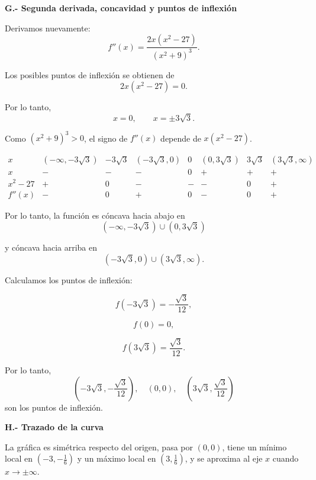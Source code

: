 \documentclass[12pt]{article}
\begin{document}
\begin{enumerate}[label=\alph*.-]
    \textbf{G.- Segunda derivada, concavidad y puntos de inflexión}

    Derivamos nuevamente:
    \[
    f''(x)
    =
    \frac{2x(x^2-27)}{(x^2+9)^3}.
    \]

    Los posibles puntos de inflexión se obtienen de
    \[
    2x(x^2-27)=0.
    \]

    Por lo tanto,
    \[
    x=0,\qquad x=\pm3\sqrt3.
    \]

    Como $(x^2+9)^3>0$, el signo de $f''(x)$ depende de
    $x(x^2-27)$.

    \[
    \begin{array}{c|ccccccc}
    x &
    (-\infty,-3\sqrt3) &
    -3\sqrt3 &
    (-3\sqrt3,0) &
    0 &
    (0,3\sqrt3) &
    3\sqrt3 &
    (3\sqrt3,\infty)
    \\
    \hline
    x & - & - & - & 0 & + & + & +\\
    x^2-27 & + & 0 & - & - & - & 0 & +\\
    \hline
    f''(x) & - & 0 & + & 0 & - & 0 & +
    \end{array}
    \]

    Por lo tanto, la función es cóncava hacia abajo en
    \[
    \boxed{
    (-\infty,-3\sqrt3)\cup(0,3\sqrt3)
    }
    \]

    y cóncava hacia arriba en
    \[
    \boxed{
    (-3\sqrt3,0)\cup(3\sqrt3,\infty).
    }
    \]

    Calculamos los puntos de inflexión:

    \[
    f(-3\sqrt3)
    =
    -\frac{\sqrt3}{12},
    \]

    \[
    f(0)=0,
    \]

    \[
    f(3\sqrt3)
    =
    \frac{\sqrt3}{12}.
    \]

    Por lo tanto,
    \[
    \boxed{
    \left(-3\sqrt3,-\frac{\sqrt3}{12}\right),
    \quad
    (0,0),
    \quad
    \left(3\sqrt3,\frac{\sqrt3}{12}\right)
    }
    \]
    son los puntos de inflexión.

    \textbf{H.- Trazado de la curva}

    La gráfica es simétrica respecto del origen, pasa por $(0,0)$,
    tiene un mínimo local en $\left(-3,-\frac16\right)$ y un máximo
    local en $\left(3,\frac16\right)$, y se aproxima al eje $x$
    cuando $x\to\pm\infty$.


\end{enumerate}
\end{document}
